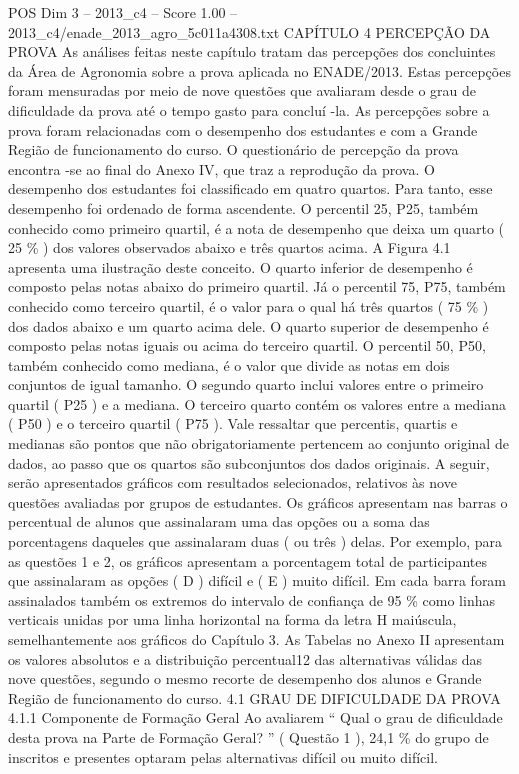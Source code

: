 \begin{textsample}{POS Dim 3 – 2013\_c4 – Score 1.00 – 2013\_c4/enade\_2013\_agro\_5c011a4308.txt}  \label{ex:f3_pos_161}
CAPÍTULO 4 PERCEPÇÃO DA PROVA As análises feitas neste capítulo tratam das percepções dos concluintes da Área de Agronomia sobre a prova aplicada no ENADE/2013.
Estas percepções foram mensuradas por meio de nove questões que avaliaram desde o grau de dificuldade da prova até o tempo gasto para concluí -la.
As percepções sobre a prova foram relacionadas com o desempenho dos estudantes e com a Grande Região de funcionamento do curso.
O questionário de percepção da prova encontra -se ao final do Anexo IV, que traz a reprodução da prova.
O desempenho dos estudantes foi classificado em quatro quartos.
Para tanto, esse desempenho foi ordenado de forma ascendente.
O percentil 25, P25, também conhecido como primeiro quartil, é a nota de desempenho que deixa um quarto ( 25 \% ) dos valores observados abaixo e três quartos acima.
A Figura 4.1 apresenta uma ilustração deste conceito.
O quarto inferior de desempenho é composto pelas notas abaixo do primeiro quartil.
Já o percentil 75, P75, também conhecido como terceiro quartil, é o valor para o qual há três quartos ( 75 \% ) dos dados abaixo e um quarto acima dele.
O quarto superior de desempenho é composto pelas notas iguais ou acima do terceiro quartil.
O percentil 50, P50, também conhecido como mediana, é o valor que divide as notas em dois conjuntos de igual tamanho.
O segundo quarto inclui valores entre o primeiro quartil ( P25 ) e a mediana.
O terceiro quarto contém os valores entre a mediana ( P50 ) e o terceiro quartil ( P75 ).
Vale ressaltar que percentis, quartis e medianas são pontos que não obrigatoriamente pertencem ao conjunto original de dados, ao passo que os quartos são subconjuntos dos dados originais.
A seguir, serão apresentados gráficos com resultados selecionados, relativos às nove questões avaliadas por grupos de estudantes.
Os gráficos apresentam nas barras o percentual de alunos que assinalaram uma das opções ou a soma das porcentagens daqueles que assinalaram duas ( ou três ) delas.
Por exemplo, para as questões 1 e 2, os gráficos apresentam a porcentagem total de participantes que assinalaram as opções ( D ) difícil e ( E ) muito difícil.
Em cada barra foram assinalados também os extremos do intervalo de confiança de 95 \% como linhas verticais unidas por uma linha horizontal na forma da letra H maiúscula, semelhantemente aos gráficos do Capítulo 3.
As Tabelas no Anexo II apresentam os valores absolutos e a distribuição percentual12 das alternativas válidas das nove questões, segundo o mesmo recorte de desempenho dos alunos e Grande Região de funcionamento do curso. 4.1 GRAU DE DIFICULDADE DA PROVA 4.1.1 Componente de Formação Geral Ao avaliarem “ Qual o grau de dificuldade desta prova na Parte de Formação Geral? ” ( Questão 1 ), 24,1 \% do grupo de inscritos e presentes optaram pelas alternativas difícil ou muito difícil.

\end{textsample}
